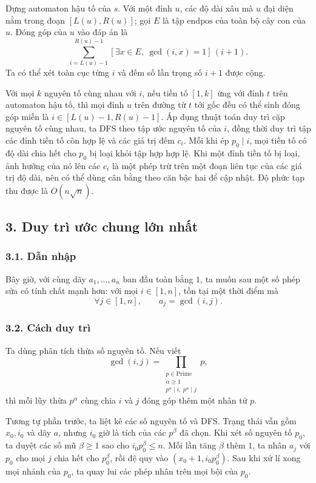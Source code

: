 \documentclass[11pt]{article}
\begin{document}
Dựng automaton hậu tố của \(s\). Với một đỉnh \(u\), các độ dài xâu mà \(u\)
đại diện nằm trong đoạn \([L(u),R(u)]\); gọi \(E\) là tập \(\mathrm{endpos}\)
của toàn bộ cây con của \(u\). Đóng góp của \(u\) vào đáp án là
\[
  \sum_{i=L(u)-1}^{R(u)-1}
  [\exists x\in E,\ \gcd(i,x)=1]\,(i+1).
\]
Ta có thể xét toàn cục từng \(i\) và đếm số lần trọng số \(i+1\) được cộng.

Với mọi \(k\) nguyên tố cùng nhau với \(i\), nếu tiền tố \([1,k]\) ứng với đỉnh
\(t\) trên automaton hậu tố, thì mọi đỉnh \(u\) trên đường từ \(t\) tới gốc đều
có thể sinh đóng góp miễn là \(i\in[L(u)-1,R(u)-1]\). Áp dụng thuật toán duy
trì cặp nguyên tố cùng nhau, ta DFS theo tập ước nguyên tố của \(i\), đồng thời
duy trì tập các đỉnh tiền tố còn hợp lệ và các giá trị đếm \(c_i\). Mỗi khi ép
\(p_0\mid i\), mọi tiền tố có độ dài chia hết cho \(p_0\) bị loại khỏi tập hợp
hợp lệ. Khi một đỉnh tiền tố bị loại, ảnh hưởng của nó lên các \(c_i\) là một
phép trừ trên một đoạn liên tục của các giá trị độ dài, nên có thể dùng cân bằng
theo căn bậc hai để cập nhật. Độ phức tạp thu được là \(O(n\sqrt n)\).

\subsection*{3. Duy trì ước chung lớn nhất}

\subsubsection*{3.1. Dẫn nhập}

Bây giờ, với cùng dãy \(a_1,\ldots,a_n\) ban đầu toàn bằng \(1\), ta muốn sau
một số phép sửa có tính chất mạnh hơn: với mọi \(i\in[1,n]\), tồn tại một thời
điểm mà
\[
  \forall j\in[1,n],\qquad a_j=\gcd(i,j).
\]

\subsubsection*{3.2. Cách duy trì}

Ta dùng phân tích thừa số nguyên tố. Nếu viết
\[
  \gcd(i,j)=\prod_{\substack{p\in\mathrm{Prime}\\ \alpha\ge 1\\
  p^\alpha\mid i,\ p^\alpha\mid j}} p,
\]
thì mỗi lũy thừa \(p^\alpha\) cùng chia \(i\) và \(j\) đóng góp thêm một nhân
tử \(p\).

Tương tự phần trước, ta liệt kê các số nguyên tố và DFS. Trạng thái vẫn gồm
\(x_0,i_0\) và dãy \(a\), nhưng \(i_0\) giờ là tích của các \(p^\beta\) đã chọn.
Khi xét số nguyên tố \(p_0\), ta duyệt các số mũ \(\beta\ge 1\) sao cho
\(i_0p_0^\beta\le n\). Mỗi lần tăng \(\beta\) thêm \(1\), ta nhân \(a_j\) với
\(p_0\) cho mọi \(j\) chia hết cho \(p_0^\beta\), rồi đệ quy vào
\((x_0+1,i_0p_0^\beta)\). Sau khi xử lí xong mọi nhánh của \(p_0\), ta quay lui
các phép nhân trên mọi bội của \(p_0\).
\end{document}
